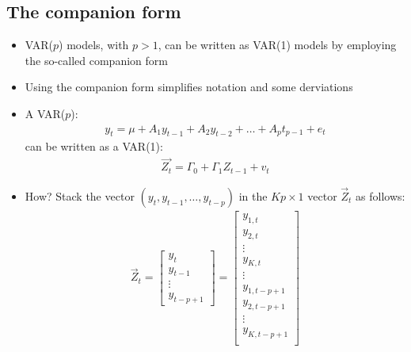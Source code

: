 \documentclass[10pt]{article}
\begin{document}
\subsection{The companion form}
\begin{itemize}
    \item VAR($p $) models, with $p > 1 $, can be written as VAR(1) models by employing the so-called companion form 
    \item Using the companion form simplifies notation and some derviations 
    \item A VAR($p $):
    \begin{gather*}
        y_t = \mu + A_1y_{t - 1} + A_2y_{t - 2} + \dots + A_pt_{p - 1} + e_t
    \end{gather*}
    can be written as a VAR(1): 
    \begin{gather*}
        \vec{Z_t} = \Gamma_0 + \Gamma_1Z_{t - 1} + v_t
    \end{gather*}
    \item How? Stack the vector $(y_t, y_{t - 1}, \dots, y_{t - p}) $ in the $Kp\times 1 $ vector $\vec{Z}_t $ as follows:
    \begin{gather*}
        \vec{Z}_t = 
        \begin{bmatrix}
            y_t \\ y_{t - 1} \\\vdots \\ y_{t - p + 1}
        \end{bmatrix}
        = 
        \begin{bmatrix}
            y_{1, t}\\
            y_{2, t}\\
            \vdots \\ 
            y_{K, t}\\
            \vdots \\ 
            y_{1, t - p + 1}\\
            y_{2, t - p + 1}\\
            \vdots \\
            y_{K, t - p + 1}\\
        \end{bmatrix}
    \end{gather*}
\end{itemize}
\newpage 
\end{document}
